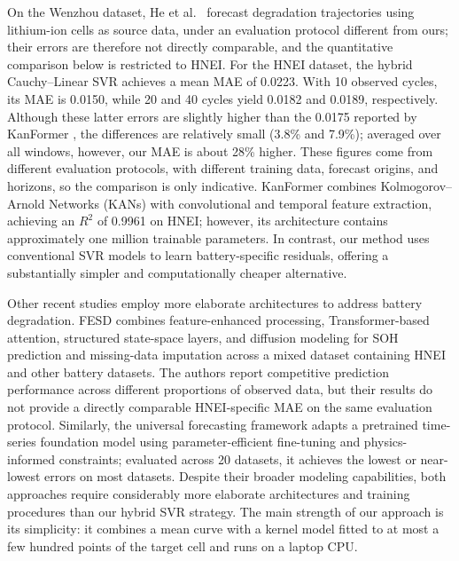 \documentclass[conference]{IEEEtran}
\begin{document}
On the Wenzhou dataset, He et al.~\cite{He2026TransferSodium} forecast degradation trajectories using lithium-ion cells as source data, under an evaluation protocol different from ours; their errors are therefore not directly comparable, and the quantitative comparison below is restricted to HNEI. For the HNEI dataset, the hybrid Cauchy--Linear SVR achieves a mean MAE of 0.0223. With 10 observed cycles, its MAE is 0.0150, while 20 and 40 cycles yield 0.0182 and 0.0189, respectively. Although these latter errors are slightly higher than the 0.0175 reported by KanFormer \cite{zhao2026kanformer}, the differences are relatively small (3.8\% and 7.9\%); averaged over all windows, however, our MAE is about 28\% higher. These figures come from different evaluation protocols, with different training data, forecast origins, and horizons, so the comparison is only indicative. KanFormer combines Kolmogorov--Arnold Networks (KANs) with convolutional and temporal feature extraction, achieving an $R^2$ of 0.9961 on HNEI; however, its architecture contains approximately one million trainable parameters. In contrast, our method uses conventional SVR models to learn battery-specific residuals, offering a substantially simpler and computationally cheaper alternative.

Other recent studies employ more elaborate architectures to address battery degradation. FESD \cite{wang2025fesd} combines feature-enhanced processing, Transformer-based attention, structured state-space layers, and diffusion modeling for SOH prediction and missing-data imputation across a mixed dataset containing HNEI and other battery datasets. The authors report competitive prediction performance across different proportions of observed data, but their results do not provide a directly comparable HNEI-specific MAE on the same evaluation protocol. Similarly, the universal forecasting framework \cite{chan2026universal} adapts a pretrained time-series foundation model using parameter-efficient fine-tuning and physics-informed constraints; evaluated across 20 datasets, it achieves the lowest or near-lowest errors on most datasets. Despite their broader modeling capabilities, both approaches require considerably more elaborate architectures and training procedures than our hybrid SVR strategy. The main strength of our approach is its simplicity: it combines a mean curve with a kernel model fitted to at most a few hundred points of the target cell and runs on a laptop CPU.

\end{document}
